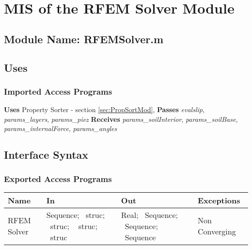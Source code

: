\documentclass[12pt, titlepage]{article}
\begin{document}

\section{MIS of the RFEM Solver Module} \label{sec:RFEMMod}

\subsection{Module Name: RFEMSolver.m}

\subsection{Uses}

\subsubsection{Imported Access Programs}

\noindent
\textbf{Uses} Property Sorter - section \ref{sec:PropSortMod},
\textbf{Passes} \textit{evalslip}, \textit{params\_layers},
\textit{params\_piez} \textbf{Receives} \textit{params\_soilInterior},
\textit{params\_soilBase}, \textit{params\_internalForce},
\textit{params\_angles}

\subsection{Interface Syntax}

\subsubsection{Exported Access Programs}
\begin{center}
\renewcommand*{\arraystretch}{1.5}
\begin{tabular}{| p{} | p{} | 
p{} | p{} |} \hline  

  \textbf{Name} & \textbf{In} & \textbf{Out} & \textbf{Exceptions}
  \\ \hline

  RFEM Solver & Sequence; ~\newline struc; ~\newline struc; ~\newline
  struc; ~\newline struc & Real; ~\newline Sequence; ~\newline Sequence;
  ~\newline Sequence & Non Converging \\ \hline
\end{tabular}
\end{center}
\end{document}

